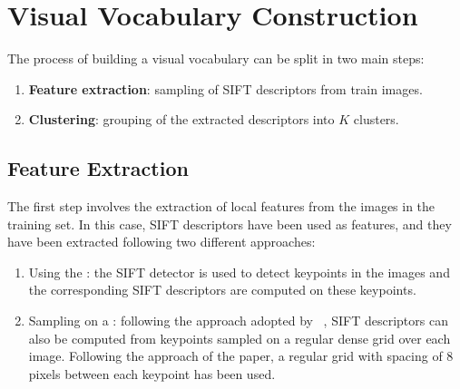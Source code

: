 \documentclass[../main.tex]{subfiles}
\begin{document}
\section{Visual Vocabulary Construction}\label{sec:visual-vocabulary-construction}

The process of building a visual vocabulary can be split in two main steps: 

\begin{enumerate}
  \item \textbf{Feature extraction}: sampling of SIFT descriptors from train images.
  \item \textbf{Clustering}: grouping of the extracted descriptors into $K$ clusters.
\end{enumerate}

\subsection{Feature Extraction}\label{subsec:feature-extraction}

The first step involves the extraction of local features from the images in the
training set. In this case, SIFT descriptors have been used as features, and they
have been extracted following two different approaches:

\begin{enumerate}
  \item Using the : the SIFT detector is used to detect keypoints in the images and the corresponding SIFT descriptors are computed on these keypoints.
  \item Sampling on a : following the approach adopted
	  by ~\cite{lazebnik}, SIFT descriptors can also be
	  computed from keypoints sampled on a regular dense grid over each image.
	  Following the approach of the paper, a regular grid with spacing of $8$ pixels between each keypoint has been used.
\end{enumerate}
\end{document}
